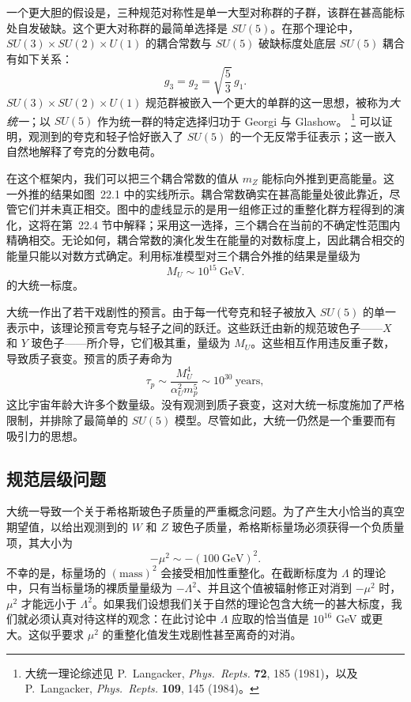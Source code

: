 一个更大胆的假设是，三种规范对称性是单一大型对称群的子群，该群在甚高能标处自发破缺。这个更大对称群的最简单选择是 $SU(5)$。在那个理论中，$SU(3)\times SU(2)\times U(1)$ 的耦合常数与 $SU(5)$ 破缺标度处底层 $SU(5)$ 耦合有如下关系：
\begin{equation}
  g_3 = g_2 = \sqrt{\frac{5}{3}}\,g_1 .
  \label{eq:22.6}
\end{equation}
$SU(3)\times SU(2)\times U(1)$ 规范群被嵌入一个更大的单群的这一思想，被称为\emph{大统一}；以 $SU(5)$ 作为统一群的特定选择归功于 Georgi 与 Glashow。%
\footnote{大统一理论综述见 P.~Langacker, \emph{Phys.\ Repts.} \textbf{72}, 185 (1981)，以及 P.~Langacker, \emph{Phys.\ Repts.} \textbf{109}, 145 (1984)。} 可以证明，观测到的夸克和轻子恰好嵌入了 $SU(5)$ 的一个无反常手征表示；这一嵌入自然地解释了夸克的分数电荷。

在这个框架内，我们可以把三个耦合常数的值从 $m_Z$ 能标向外推到更高能量。这一外推的结果如图~22.1 中的实线所示。耦合常数确实在甚高能量处彼此靠近，尽管它们并未真正相交。图中的虚线显示的是用一组修正过的重整化群方程得到的演化，这将在第~22.4 节中解释；采用这一选择，三个耦合在当前的不确定性范围内精确相交。无论如何，耦合常数的演化发生在能量的对数标度上，因此耦合相交的能量只能以对数方式确定。利用标准模型对三个耦合外推的结果是量级为
\begin{equation}
  M_U \sim 10^{15}\ \mathrm{GeV} .
\end{equation}
的大统一标度。

大统一作出了若干戏剧性的预言。由于每一代夸克和轻子被放入 $SU(5)$ 的单一表示中，该理论预言夸克与轻子之间的跃迁。这些跃迁由新的规范玻色子——$X$ 和 $Y$ 玻色子——所介导，它们极其重，量级为 $M_U$。这些相互作用违反重子数，导致质子衰变。预言的质子寿命为
\begin{equation}
  \tau_p \sim \frac{M_U^4}{\alpha_U^2 m_p^5} \sim 10^{30}\ \mathrm{years} ,
  \label{eq:22.7}
\end{equation}
这比宇宙年龄大许多个数量级。没有观测到质子衰变，这对大统一标度施加了严格限制，并排除了最简单的 $SU(5)$ 模型。尽管如此，大统一仍然是一个重要而有吸引力的思想。

\subsection{规范层级问题}

大统一导致一个关于希格斯玻色子质量的严重概念问题。为了产生大小恰当的真空期望值，以给出观测到的 $W$ 和 $Z$ 玻色子质量，希格斯标量场必须获得一个负质量项，其大小为
\begin{equation}
  -\mu^2 \sim -(100\ \mathrm{GeV})^2 .
  \label{eq:22.8}
\end{equation}
不幸的是，标量场的 $(\mathrm{mass})^2$ 会接受相加性重整化。在截断标度为 $\Lambda$ 的理论中，只有当标量场的裸质量量级为 $-\Lambda^2$、并且这个值被辐射修正对消到 $-\mu^2$ 时，$\mu^2$ 才能远小于 $\Lambda^2$。如果我们设想我们关于自然的理论包含大统一的甚大标度，我们就必须认真对待这样的观念：在此讨论中 $\Lambda$ 应取的恰当值是 $10^{16}$ GeV 或更大。这似乎要求 $\mu^2$ 的重整化值发生戏剧性甚至离奇的对消。

